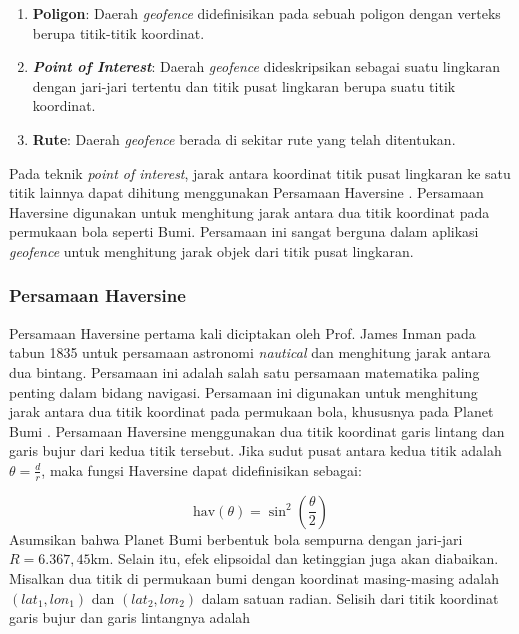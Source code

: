 \begin{enumerate}
	\item \textbf{Poligon}: Daerah \textit{geofence} didefinisikan pada sebuah poligon dengan verteks berupa titik-titik koordinat.
	\item \textbf{\textit{Point of Interest}}: Daerah \textit{geofence} dideskripsikan sebagai suatu lingkaran dengan jari-jari tertentu dan titik pusat lingkaran berupa suatu titik koordinat.
	\item \textbf{Rute}: Daerah \textit{geofence} berada di sekitar rute yang telah ditentukan.
\end{enumerate}

Pada teknik \textit{point of interest}, jarak antara koordinat titik pusat lingkaran ke satu titik lainnya dapat dihitung menggunakan Persamaan Haversine  \cite{Pratama2020}. Persamaan Haversine digunakan untuk menghitung jarak antara dua titik koordinat pada permukaan bola seperti Bumi. Persamaan ini sangat berguna dalam aplikasi \textit{geofence} untuk menghitung jarak objek dari titik pusat lingkaran.

\subsubsection{Persamaan Haversine}
Persamaan Haversine pertama kali diciptakan oleh Prof. James Inman pada tabun 1835 untuk persamaan astronomi \textit{nautical} dan menghitung jarak antara dua bintang. Persamaan ini adalah salah satu persamaan matematika paling penting dalam bidang navigasi. Persamaan ini digunakan untuk menghitung jarak antara dua titik koordinat pada permukaan bola, khususnya pada Planet Bumi \cite{Hofmann-Wellenhof2008}\cite{Feng2013}. Persamaan Haversine menggunakan dua titik koordinat garis lintang dan garis bujur dari kedua titik tersebut. Jika sudut pusat antara kedua titik adalah $\theta = \frac{d}{r}$, maka fungsi Haversine dapat didefinisikan sebagai:

\begin{equation}
	\text{hav}(\theta) = \sin^2{\left(\frac{\theta}{2}\right)}
	\label{eq:haversine}
\end{equation}
Asumsikan bahwa Planet Bumi berbentuk bola sempurna dengan jari-jari $R=6.367,45$km. Selain itu, efek elipsoidal dan ketinggian juga akan diabaikan. Misalkan dua titik di permukaan bumi dengan koordinat masing-masing adalah $(lat_1, lon_1)$ dan $(lat_2, lon_2)$ dalam satuan radian. Selisih dari titik koordinat garis bujur dan garis lintangnya adalah

